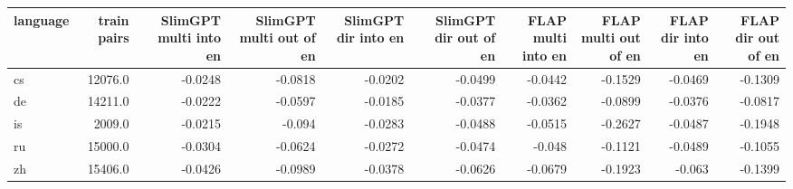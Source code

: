 \begin{tabular}{lrrrrrrrrr}
\toprule
language & train pairs & SlimGPT multi into en & SlimGPT multi out of en & SlimGPT dir into en & SlimGPT dir out of en & FLAP multi into en & FLAP multi out of en & FLAP dir into en & FLAP dir out of en \\
\midrule
cs & 12076.0 & -0.0248 & -0.0818 & -0.0202 & -0.0499 & -0.0442 & -0.1529 & -0.0469 & -0.1309 \\
de & 14211.0 & -0.0222 & -0.0597 & -0.0185 & -0.0377 & -0.0362 & -0.0899 & -0.0376 & -0.0817 \\
is & 2009.0 & -0.0215 & -0.094 & -0.0283 & -0.0488 & -0.0515 & -0.2627 & -0.0487 & -0.1948 \\
ru & 15000.0 & -0.0304 & -0.0624 & -0.0272 & -0.0474 & -0.048 & -0.1121 & -0.0489 & -0.1055 \\
zh & 15406.0 & -0.0426 & -0.0989 & -0.0378 & -0.0626 & -0.0679 & -0.1923 & -0.063 & -0.1399 \\
\bottomrule
\end{tabular}
